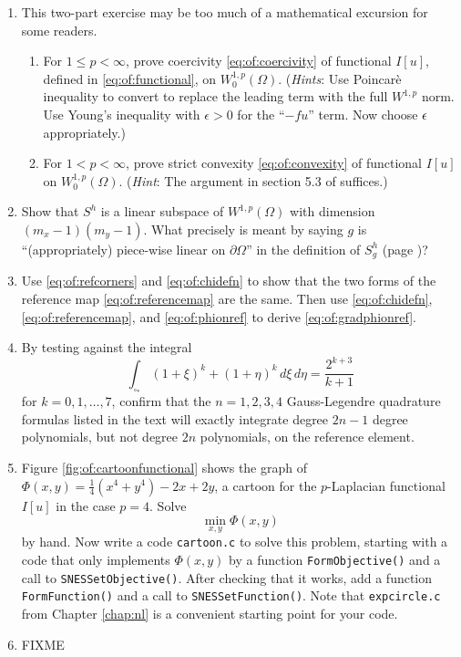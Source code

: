 \renewcommand{\labelenumi}{\arabic{chapter}.\arabic{enumi}\quad}
\renewcommand{\labelenumii}{(\alph{enumii})}
\begin{enumerate}
\item  \label{exer:of:twoproperties}  This two-part exercise may be too much of a mathematical excursion for some readers.
  \begin{enumerate}
  \item For $1 \le p < \infty$, prove coercivity \eqref{eq:of:coercivity} of functional $I[u]$, defined in \eqref{eq:of:functional}, on $W_0^{1,p}(\Omega)$.  (\emph{Hints}:  Use Poincar\`e inequality \citep[Theorem 6.30]{AdamsFournier2003} to convert to replace the leading term with the full $W^{1,p}$ norm.  Use Young's inequality with $\epsilon>0$ \citep[Appendix B]{Evans2010} for the ``$-fu$'' term.  Now choose $\epsilon$ appropriately.)
  \item For $1 < p < \infty$, prove strict convexity \eqref{eq:of:convexity} of functional $I[u]$ on $W_0^{1,p}(\Omega)$.  (\emph{Hint}:  The argument in section 5.3 of \citet{Ciarlet2002} suffices.)
  \end{enumerate}

\item Show that $S^h$ is a linear subspace of $W^{1,p}(\Omega)$ with dimension $(m_x-1)(m_y-1)$.  What precisely is meant by saying $g$ is ``(appropriately) piece-wise linear on $\partial\Omega$'' in the definition of $S_g^h$ (page \pageref{eq:of:Sghdefn})?

\item  Use \eqref{eq:of:refcorners} and \eqref{eq:of:chidefn} to show that the two forms of the reference map \eqref{eq:of:referencemap} are the same.  Then use \eqref{eq:of:chidefn}, \eqref{eq:of:referencemap}, and \eqref{eq:of:phionref} to derive \eqref{eq:of:gradphionref}.

\item By testing against the integral
    $$\int_{\square_\ast} (1+\xi)^k + (1+\eta)^k\,d\xi\, d\eta = \frac{2^{k+3}}{k+1}$$
for $k=0,1,\dots,7$, confirm that the $n=1,2,3,4$ Gauss-Legendre quadrature formulas listed in the text will exactly integrate degree $2n-1$ degree polynomials, but not degree $2n$ polynomials, on the reference element.

\item Figure \ref{fig:of:cartoonfunctional} shows the graph of $\Phi(x,y)=\tfrac{1}{4}(x^4+y^4) - 2x + 2y$, a cartoon for the $p$-Laplacian functional $I[u]$ in the case $p=4$.  Solve
    $$\min_{x,y} \Phi(x,y)$$
by hand.  Now write a \PETSc code \texttt{cartoon.c} to solve this problem, starting with a code that only implements $\Phi(x,y)$ by a function \texttt{FormObjective()} and a call to \texttt{SNESSetObjective()}.  After checking that it works, add a function \texttt{FormFunction()} and a call to \texttt{SNESSetFunction()}.  Note that \texttt{expcircle.c} from Chapter \ref{chap:nl} is a convenient starting point for your code.

\item FIXME
\end{enumerate}